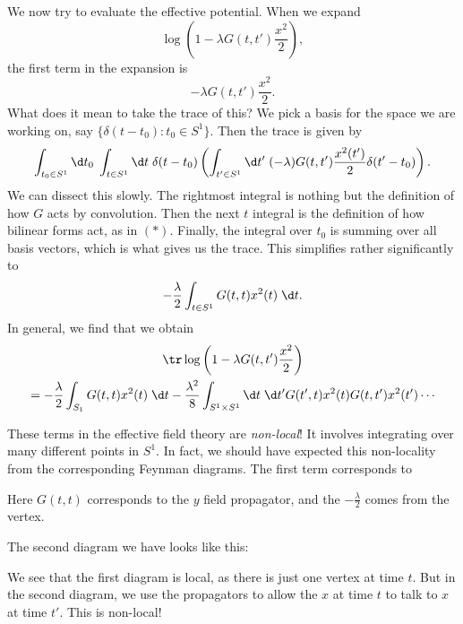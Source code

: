 \documentclass[a4paper]{article}
\begin{document}
We now try to evaluate the effective potential. When we expand
\[
  \log \left(1 - \lambda G(t, t') \frac{x^2}{2}\right),
\]
the first term in the expansion is
\[
  -\lambda G(t, t') \frac{x^2}{2}.
\]
What does it mean to take the trace of this? We pick a basis for the space we are working on, say $\{\delta(t - t_0): t_0 \in S^1\}$. Then the trace is given by
\[
  \int_{t_0 \in S^1} \d t_0\; \int_{t \in S^1}\d t\; \delta(t - t_0) \left(\int_{t' \in S^1} \d t'\; (-\lambda) G(t, t') \frac{x^2(t')}{2} \delta(t' - t_0)\right).
\]
We can dissect this slowly. The rightmost integral is nothing but the definition of how $G$ acts by convolution. Then the next $t$ integral is the definition of how bilinear forms act, as in $(*)$. Finally, the integral over $t_0$ is summing over all basis vectors, which is what gives us the trace. This simplifies rather significantly to
\[
  -\frac{\lambda}{2} \int_{t \in S^1} G(t, t) x^2(t) \;\d t.
\]
In general, we find that we obtain
\begin{multline*}
  \tr \log \left(1 - \lambda G(t, t') \frac{x^2}{2}\right) \\
  = - \frac{\lambda}{2} \int_{S_1}G(t, t) x^2(t) \;\d t - \frac{\lambda^2}{8} \int_{S^1 \times S^1} \d t\; \d t' G(t', t) x^2(t) G(t, t') x^2(t') \cdots
\end{multline*}

These terms in the effective field theory are \emph{non-local}! It involves integrating over many different points in $S^1$. In fact, we should have expected this non-locality from the corresponding Feynman diagrams. The first term corresponds to
\begin{center}
\end{center}
Here $G(t, t)$ corresponds to the $y$ field propagator, and the $-\frac{\lambda}{2}$ comes from the vertex.

The second diagram we have looks like this:
\begin{center}
\end{center}
We see that the first diagram is local, as there is just one vertex at time $t$. But in the second diagram, we use the propagators to allow the $x$ at time $t$ to talk to $x$ at time $t'$. This is non-local!
\end{document}
